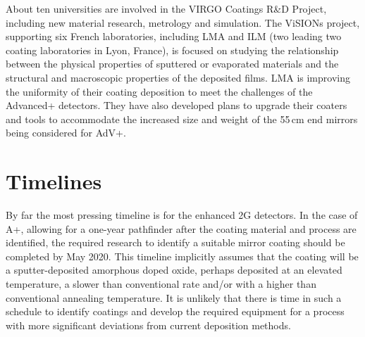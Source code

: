 About ten universities are involved in the VIRGO Coatings R\&D Project, including new material research, metrology and 
simulation. The ViSIONs project, supporting six French laboratories, including LMA and ILM (two leading two coating laboratories in Lyon, France), is focused on studying the relationship between the physical properties of sputtered or evaporated materials and the structural and macroscopic properties of the deposited films. 
LMA is improving the uniformity of their coating deposition to meet the challenges of the Advanced+ detectors. They have also developed plans to upgrade their coaters and tools to accommodate the increased size and weight of the 55\,cm end mirrors being considered for AdV+.

\section{Timelines}

By far the most pressing timeline is for the enhanced 2G detectors. In the case of A+, allowing for a one-year pathfinder after the coating material and process are identified, the required research to identify a suitable mirror coating should be completed by May 2020. This timeline implicitly assumes that the coating will be a sputter-deposited amorphous doped oxide, perhaps deposited at an elevated temperature, a slower than conventional rate and/or with a higher than conventional annealing temperature. It is unlikely that there is time in such a schedule to identify coatings and develop the required equipment for a process with more significant deviations from current deposition methods.

